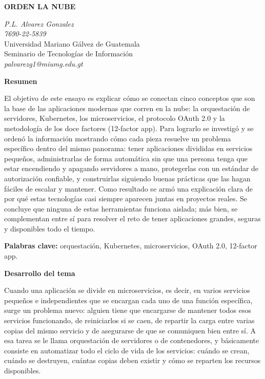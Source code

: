 \documentclass[12pt,letterpaper]{article}
\begin{document}
\begin{center}
\textbf{\Large ORDEN LA NUBE}
\end{center}

\begin{center}
\textit{P.L. Alvarez Gonzalez } \\
\textit{7690-22-5839} \\
Universidad Mariano Gálvez de Guatemala \\
Seminario de Tecnologías de Información \\
\textit{palvarezg1@miumg.edu.gt}
\end{center}

\vspace{0.5cm}

\textbf{Resumen}

El objetivo de este ensayo es explicar cómo se conectan cinco conceptos que son la base de las aplicaciones modernas que corren en la nube: la orquestación de servidores, Kubernetes, los microservicios, el protocolo OAuth 2.0 y la metodología de los doce factores (12-factor app). Para lograrlo se investigó y se ordenó la información mostrando cómo cada pieza resuelve un problema específico dentro del mismo panorama: tener aplicaciones divididas en servicios pequeños, administrarlas de forma automática sin que una persona tenga que estar encendiendo y apagando servidores a mano, protegerlas con un estándar de autorización confiable, y construirlas siguiendo buenas prácticas que las hagan fáciles de escalar y mantener. Como resultado se armó una explicación clara de por qué estas tecnologías casi siempre aparecen juntas en proyectos reales. Se concluye que ninguna de estas herramientas funciona aislada; más bien, se complementan entre sí para resolver el reto de tener aplicaciones grandes, seguras y disponibles todo el tiempo.

\textbf{Palabras clave:} orquestación, Kubernetes, microservicios, OAuth 2.0, 12-factor app.

\textbf{Desarrollo del tema}

Cuando una aplicación se divide en microservicios, es decir, en varios servicios pequeños e independientes que se encargan cada uno de una función específica, surge un problema nuevo: alguien tiene que encargarse de mantener todos esos servicios funcionando, de reiniciarlos si se caen, de repartir la carga entre varias copias del mismo servicio y de asegurarse de que se comuniquen bien entre sí. A esa tarea se le llama orquestación de servidores o de contenedores, y básicamente consiste en automatizar todo el ciclo de vida de los servicios: cuándo se crean, cuándo se destruyen, cuántas copias deben existir y cómo se reparten los recursos disponibles.
\end{document}
